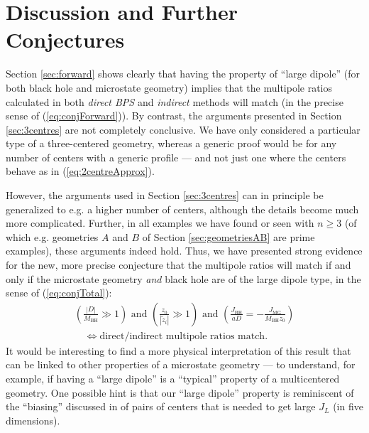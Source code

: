 \documentclass[12pt,a4paper]{article}
\newcommand{\be}{\begin{equation}}
\newcommand{\ee}{\end{equation}}
\def\indirect{\emph{indirect} }
\def\direct{\emph{direct BPS} }
\begin{document}
\section{Discussion and Further Conjectures}\label{sec:moreconj}

  Section \ref{sec:forward} shows clearly that having the property of ``large dipole'' (for both black hole and microstate geometry) implies that the multipole ratios calculated in both \direct and \indirect methods will match (in the precise sense of (\ref{eq:conjForward})). By contrast, the arguments presented in Section \ref{sec:3centres} are not completely conclusive. We have only considered a particular type of a three-centered geometry, whereas a generic proof would be for any number of centers with a generic profile --- and not just one where the centers behave as in (\ref{eq:2centreApprox}).
  
  However, the arguments used in Section \ref{sec:3centres} can in principle be generalized to e.g. a higher number of centers, although the details become much more complicated. Further, in all examples we have found or seen with $n\geq 3$ (of which e.g. geometries $A$ and $B$ of Section \ref{sec:geometriesAB} are prime examples), these arguments indeed hold. Thus, we have presented strong evidence for the new, more precise conjecture that the multipole ratios will match if and only if the microstate geometry \emph{and} black hole are of the large dipole type, in the sense of (\ref{eq:conjTotal}):
  \be \begin{aligned} \label{eq:conjTotalrepeat} \left(\frac{|D|}{M_\text{BH}}\gg 1\right) \text{ and } \left(\frac{z_0}{|\tilde z_i|}\gg 1\right) \text{ and } \left(\frac{J_\text{BH}}{aD} = -\frac{J_{\text{MG}}}{M_\text{BH}z_0}\right)\\
 \quad \Leftrightarrow \text{direct/indirect multipole ratios match}.
 \end{aligned}\ee
 It would be interesting to find a more physical interpretation of this result that can be linked to other properties of a microstate geometry --- to understand, for example, if having a ``large dipole'' is a ``typical'' property of a multicentered geometry. One possible hint is that our ``large dipole'' property is reminiscent of the ``biasing'' discussed in \cite{Bena:2006is} of pairs of centers that is needed to get large $J_L$ (in five dimensions).

  
  \medskip
  
\end{document}
